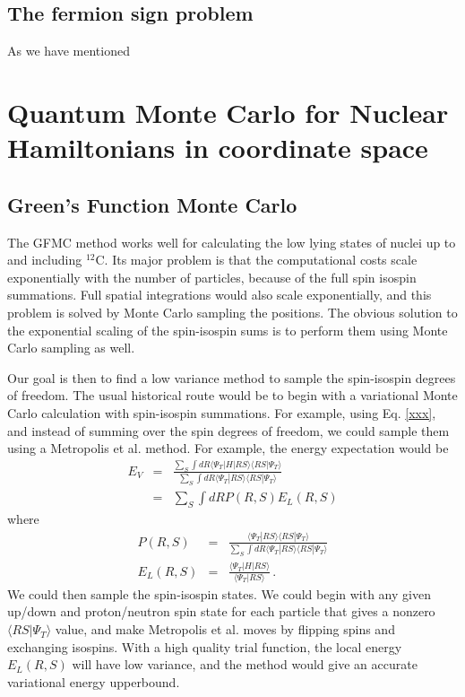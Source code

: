 \subsection{The fermion sign problem}
As we have mentioned 

\section{Quantum Monte Carlo for Nuclear Hamiltonians in coordinate space}
\subsection{Green's Function Monte Carlo}


The GFMC method works well for calculating the low lying states of nuclei
up to and including $^{12}$C. Its major problem is that the computational
costs scale exponentially with the number of particles, because of the
full spin isospin summations. Full spatial integrations
would also scale exponentially, and this problem is solved by Monte Carlo
sampling the positions. The obvious solution to the exponential scaling
of the spin-isospin sums is to perform them using Monte Carlo sampling
as well.

Our goal is then to find a low variance method to sample the spin-isospin
degrees of freedom. The usual historical route would be to begin with a
variational Monte Carlo calculation with spin-isospin summations.
For example, using Eq. \ref{xxx}, and instead of summing over the spin
degrees of freedom, we could sample them using a Metropolis et al.\cite{xxx}
method. For example, the energy expectation would be
\begin{eqnarray}
E_V &=&
\frac{\sum_{S} \int dR \langle \Psi_T|H|RS\rangle \langle RS|\Psi_T\rangle}
{\sum_{S} \int dR \langle \Psi_T|RS\rangle \langle RS|\Psi_T\rangle}
\nonumber\\
&=& \sum_S \int dR P(R,S) E_L(R,S)
\end{eqnarray}
where
\begin{eqnarray}
P(R,S) &= &
\frac{\langle \Psi_T|RS\rangle \langle RS|\Psi_T\rangle}
{\sum_{S} \int dR \langle \Psi_T|RS\rangle \langle RS|\Psi_T\rangle}
\nonumber\\
E_L(R,S) &=& \frac{\langle \Psi_T|H|RS\rangle}{\langle \Psi_T|RS\rangle} \,.
\end{eqnarray}
We could then sample the spin-isospin states. We could begin with any
given up/down and proton/neutron spin state for each particle that gives
a nonzero $\langle RS|\Psi_T\rangle$ value, and make Metropolis et al.
moves by flipping spins and exchanging isospins. With a high quality
trial function, the local energy $E_L(R,S)$ will have low variance, and
the method would give an accurate variational energy upperbound.

